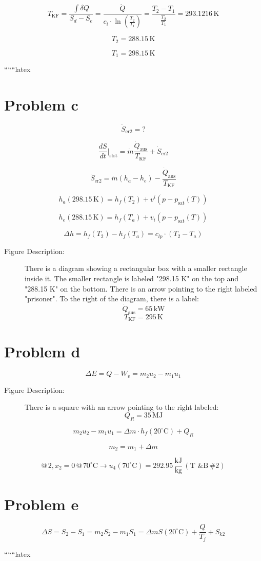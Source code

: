 \[
T_{\text{KF}} = \frac{\int \delta Q}{S_d - S_e} = \frac{\dot{Q}}{c_{i} \cdot \ln \left( \frac{T_2}{T_1} \right)} = \frac{T_2 - T_1}{\frac{T_2}{T_1}} = 293.1216 \, \text{K}
\]

\[
T_2 = 288.15 \, \text{K}
\]

\[
T_1 = 298.15 \, \text{K}
\]

``````latex


\section*{Problem c}

\[
\dot{S}_{\text{er2}} = ?
\]

\[
\frac{dS}{dt} \bigg|_{\text{stst}} = \dot{m} \frac{\dot{Q}_{\text{aus}}}{T_{\text{KF}}} + \dot{S}_{\text{er2}}
\]

\[
\dot{S}_{\text{er2}} = \dot{m} (h_a - h_e) - \frac{\dot{Q}_{\text{aus}}}{T_{\text{KF}}}
\]

\[
h_a (298.15 \, \text{K}) = h_f (T_2) + v^i (p - p_{\text{sat}} (T))
\]

\[
h_e (288.15 \, \text{K}) = h_f (T_a) + v_i (p - p_{\text{sat}} (T))
\]

\[
\Delta h = h_f (T_2) - h_f (T_a) = c_{lp} \cdot (T_2 - T_a)
\]

\begin{description}
\item[Figure Description:] 
There is a diagram showing a rectangular box with a smaller rectangle inside it. The smaller rectangle is labeled "298.15 K" on the top and "288.15 K" on the bottom. There is an arrow pointing to the right labeled "prisoner". To the right of the diagram, there is a label: 
\[
\dot{Q}_{\text{aus}} = 65 \, \text{kW}
\]
\[
T_{\text{KF}} = 295 \, \text{K}
\]
\end{description}

\section*{Problem d}

\[
\Delta E = Q - W_v = m_2 u_2 - m_1 u_1
\]

\begin{description}
\item[Figure Description:] 
There is a square with an arrow pointing to the right labeled:
\[
Q_R = 35 \, \text{MJ}
\]
\end{description}

\[
m_2 u_2 - m_1 u_1 = \Delta m \cdot h_f (20^\circ \text{C}) + Q_R
\]

\[
m_2 = m_1 + \Delta m
\]

\[
@ \, 2, x_2 = 0 \, @ \, 70^\circ \text{C} \rightarrow u_4 (70^\circ \text{C}) = 292.95 \, \frac{\text{kJ}}{\text{kg}} \, (\text{T \& B} \, \#2)
\]

\section*{Problem e}

\[
\Delta S = S_2 - S_1 = m_2 S_2 - m_1 S_1 = \Delta m S (20^\circ \text{C}) + \frac{Q}{T_j} + S_{k2}
\]

``````latex


